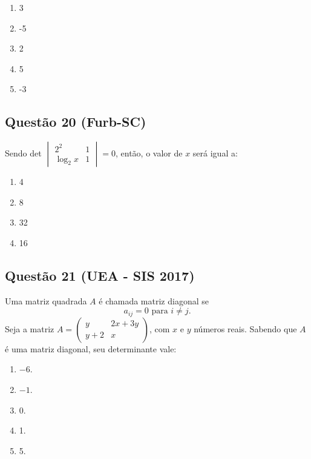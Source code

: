 \documentclass{article}
\begin{document}
\begin{multicols}{2}
		\begin{enumerate}[label=(\Alph*), noitemsep]
			\item 3
			\item -5
			\item 2
			\item 5
			\item -3
		\end{enumerate}
		
		\subsection*{Questão 20 (Furb-SC)}
		Sendo det \(\begin{vmatrix} 2^2 & 1 \\ \log_2 x & 1 \end{vmatrix} = 0\), então, o valor de \( x \) será igual a:
		
		\begin{enumerate}[label=(\Alph*), noitemsep]
			\item 4
			\item 8
			\item 32
			\item 16
		\end{enumerate}
		
		\subsection*{Questão 21 (UEA - SIS 2017)} 
		Uma matriz quadrada \( A \) é chamada matriz diagonal se  
		\[
		a_{ij} = 0 \text{ para } i \neq j.
		\]
		Seja a matriz \( A = \begin{pmatrix} y & 2x + 3y \\ y + 2 & x \end{pmatrix} \), com  
		\( x \) e \( y \) números reais. Sabendo que \( A \) é uma matriz diagonal, seu determinante vale:
		
		\begin{enumerate}[label=(\Alph*), noitemsep]
			\item \(-6\).
			\item \(-1\).
			\item 0.
			\item 1.
			\item 5.
		\end{enumerate}
		
		
		
	\end{multicols}
	
\end{document}
